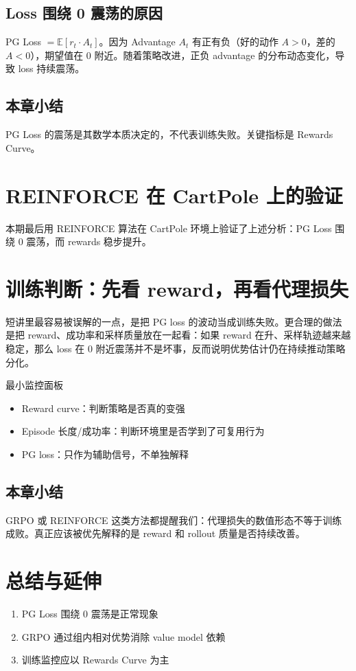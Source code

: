 \documentclass[a4paper]{article}
\begin{document}
\subsection{Loss 围绕 0 震荡的原因}
PG Loss $= \mathbb{E}[r_t \cdot A_t]$。因为 Advantage $A_t$ 有正有负（好的动作 $A > 0$，差的 $A < 0$），期望值在 0 附近。随着策略改进，正负 advantage 的分布动态变化，导致 loss 持续震荡。

\subsection{本章小结}
PG Loss 的震荡是其数学本质决定的，不代表训练失败。关键指标是 Rewards Curve。

\section{REINFORCE 在 CartPole 上的验证}
本期最后用 REINFORCE 算法在 CartPole 环境上验证了上述分析：PG Loss 围绕 0 震荡，而 rewards 稳步提升。

\newpage
\section{训练判断：先看 reward，再看代理损失}
短讲里最容易被误解的一点，是把 PG loss 的波动当成训练失败。更合理的做法是把 reward、成功率和采样质量放在一起看：如果 reward 在升、采样轨迹越来越稳定，那么 loss 在 0 附近震荡并不是坏事，反而说明优势估计仍在持续推动策略分化。

\begin{knowledgebox}{最小监控面板}
\begin{itemize}
  \item Reward curve：判断策略是否真的变强
  \item Episode 长度/成功率：判断环境里是否学到了可复用行为
  \item PG loss：只作为辅助信号，不单独解释
\end{itemize}
\end{knowledgebox}

\subsection{本章小结}
GRPO 或 REINFORCE 这类方法都提醒我们：代理损失的数值形态不等于训练成败。真正应该被优先解释的是 reward 和 rollout 质量是否持续改善。

\newpage
\section{总结与延伸}
\begin{enumerate}
  \item PG Loss 围绕 0 震荡是正常现象
  \item GRPO 通过组内相对优势消除 value model 依赖
  \item 训练监控应以 Rewards Curve 为主
\end{enumerate}
\end{document}
